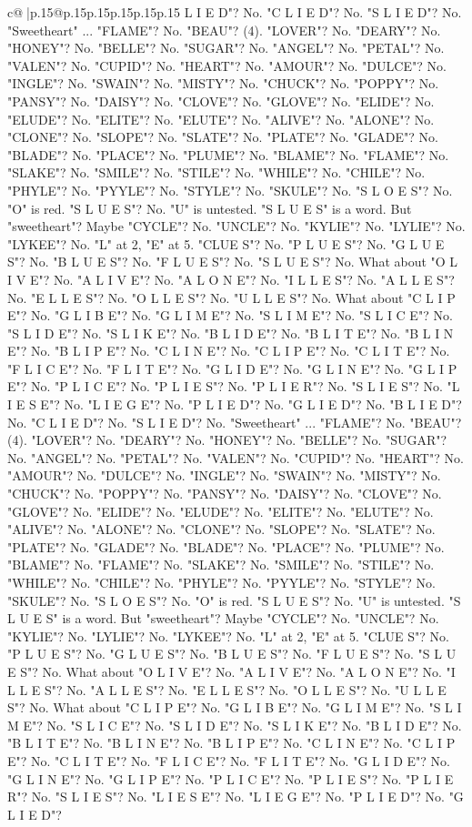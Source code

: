 \documentclass{article}
\begin{document}
{\begin{supertabular}{c@{$\;$}|p{.15\linewidth}@{}p{.15\linewidth}p{.15\linewidth}p{.15\linewidth}p{.15\linewidth}p{.15\linewidth}}
{{{L I E D"? No. "C L I E D"? No. "S L I E D"? No. "Sweetheart" ... "FLAME"? No. "BEAU"? (4). "LOVER"? No. "DEARY"? No. "HONEY"? No. "BELLE"? No. "SUGAR"? No. "ANGEL"? No. "PETAL"? No. "VALEN"? No. "CUPID"? No. "HEART"? No. "AMOUR"? No. "DULCE"? No. "INGLE"? No. "SWAIN"? No. "MISTY"? No. "CHUCK"? No. "POPPY"? No. "PANSY"? No. "DAISY"? No. "CLOVE"? No. "GLOVE"? No. "ELIDE"? No. "ELUDE"? No. "ELITE"? No. "ELUTE"? No. "ALIVE"? No. "ALONE"? No. "CLONE"? No. "SLOPE"? No. "SLATE"? No. "PLATE"? No. "GLADE"? No. "BLADE"? No. "PLACE"? No. "PLUME"? No. "BLAME"? No. "FLAME"? No. "SLAKE"? No. "SMILE"? No. "STILE"? No. "WHILE"? No. "CHILE"? No. "PHYLE"? No. "PYYLE"? No. "STYLE"? No. "SKULE"? No. "S L O E S"? No. "O" is red. "S L U E S"? No. "U" is untested. "S L U E S" is a word. But "sweetheart"? Maybe "CYCLE"? No. "UNCLE"? No. "KYLIE"? No. "LYLIE"? No. "LYKEE"? No. "L" at 2, "E" at 5. "CLUE S"? No. "P L U E S"? No. "G L U E S"? No. "B L U E S"? No. "F L U E S"? No. "S L U E S"? No. What about "O L I V E"? No. "A L I V E"? No. "A L O N E"? No. "I L L E S"? No. "A L L E S"? No. "E L L E S"? No. "O L L E S"? No. "U L L E S"? No. What about "C L I P E"? No. "G L I B E"? No. "G L I M E"? No. "S L I M E"? No. "S L I C E"? No. "S L I D E"? No. "S L I K E"? No. "B L I D E"? No. "B L I T E"? No. "B L I N E"? No. "B L I P E"? No. "C L I N E"? No. "C L I P E"? No. "C L I T E"? No. "F L I C E"? No. "F L I T E"? No. "G L I D E"? No. "G L I N E"? No. "G L I P E"? No. "P L I C E"? No. "P L I E S"? No. "P L I E R"? No. "S L I E S"? No. "L I E S E"? No. "L I E G E"? No. "P L I E D"? No. "G L I E D"? No. "B L I E D"? No. "C L I E D"? No. "S L I E D"? No. "Sweetheart" ... "FLAME"? No. "BEAU"? (4). "LOVER"? No. "DEARY"? No. "HONEY"? No. "BELLE"? No. "SUGAR"? No. "ANGEL"? No. "PETAL"? No. "VALEN"? No. "CUPID"? No. "HEART"? No. "AMOUR"? No. "DULCE"? No. "INGLE"? No. "SWAIN"? No. "MISTY"? No. "CHUCK"? No. "POPPY"? No. "PANSY"? No. "DAISY"? No. "CLOVE"? No. "GLOVE"? No. "ELIDE"? No. "ELUDE"? No. "ELITE"? No. "ELUTE"? No. "ALIVE"? No. "ALONE"? No. "CLONE"? No. "SLOPE"? No. "SLATE"? No. "PLATE"? No. "GLADE"? No. "BLADE"? No. "PLACE"? No. "PLUME"? No. "BLAME"? No. "FLAME"? No. "SLAKE"? No. "SMILE"? No. "STILE"? No. "WHILE"? No. "CHILE"? No. "PHYLE"? No. "PYYLE"? No. "STYLE"? No. "SKULE"? No. "S L O E S"? No. "O" is red. "S L U E S"? No. "U" is untested. "S L U E S" is a word. But "sweetheart"? Maybe "CYCLE"? No. "UNCLE"? No. "KYLIE"? No. "LYLIE"? No. "LYKEE"? No. "L" at 2, "E" at 5. "CLUE S"? No. "P L U E S"? No. "G L U E S"? No. "B L U E S"? No. "F L U E S"? No. "S L U E S"? No. What about "O L I V E"? No. "A L I V E"? No. "A L O N E"? No. "I L L E S"? No. "A L L E S"? No. "E L L E S"? No. "O L L E S"? No. "U L L E S"? No. What about "C L I P E"? No. "G L I B E"? No. "G L I M E"? No. "S L I M E"? No. "S L I C E"? No. "S L I D E"? No. "S L I K E"? No. "B L I D E"? No. "B L I T E"? No. "B L I N E"? No. "B L I P E"? No. "C L I N E"? No. "C L I P E"? No. "C L I T E"? No. "F L I C E"? No. "F L I T E"? No. "G L I D E"? No. "G L I N E"? No. "G L I P E"? No. "P L I C E"? No. "P L I E S"? No. "P L I E R"? No. "S L I E S"? No. "L I E S E"? No. "L I E G E"? No. "P L I E D"? No. "G L I E D"? }}}
\end{supertabular}}
\end{document}
